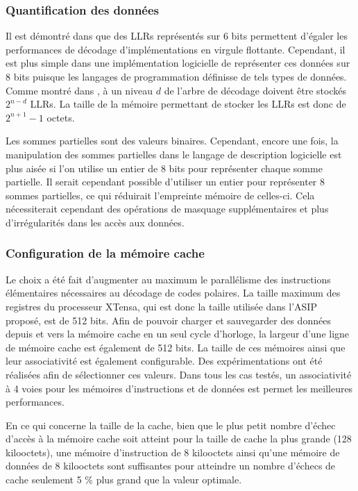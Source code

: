 \subsubsection{Quantification des données}
Il est démontré dans \cite{sarkis_fast_2014} que des LLRs représentés sur 6 bits permettent d'égaler les performances de décodage d'implémentations en virgule flottante. Cependant, il est plus simple dans une implémentation logicielle de représenter ces données sur 8 bits puisque les langages de programmation définisse de tels types de données. Comme montré dans \cite{leroux_hardware_2011}, à un niveau $d$ de l'arbre de décodage doivent être stockés $2^{n-d}$ LLRs. La taille de la mémoire permettant de stocker les LLRs est donc de $2^{n+1}-1$ octets.

Les sommes partielles sont des valeurs binaires. Cependant, encore une fois, la manipulation des sommes partielles dans le langage de description logicielle est plus aisée si l'on utilise un entier de 8 bits pour représenter chaque somme partielle. Il serait cependant possible d'utiliser un entier pour représenter 8 sommes partielles, ce qui réduirait l'empreinte mémoire de celles-ci. Cela nécessiterait cependant des opérations de masquage supplémentaires et plus d'irrégularités dans les accès aux données.

\subsubsection{Configuration de la mémoire cache}
Le choix a été fait d'augmenter au maximum le parallélisme des instructions élémentaires nécessaires au décodage de codes polaires. La taille maximum des registres du processeur XTensa, qui est donc la taille utilisée dans l'ASIP proposé, est de 512 bits. Afin de pouvoir charger et sauvegarder des données depuis et vers la mémoire cache en un seul cycle d'horloge, la largeur d'une ligne de mémoire cache est également de 512 bits. La taille de ces mémoires ainsi que leur associativité est également configurable. Des expérimentations ont été réalisées afin de sélectionner ces valeurs. Dans tous les cas testés, un associativité à 4 voies pour les mémoires d'instructions et de données est permet les meilleures performances.

En ce qui concerne la taille de la cache, bien que le plus petit nombre d'échec d'accès à la mémoire cache soit atteint pour la taille de cache la plus grande (128 kilooctets), une mémoire d'instruction de 8 kilooctets ainsi qu'une mémoire de données de 8 kilooctets sont suffisantes pour atteindre un nombre d'échecs de cache seulement 5 \%
plus grand que la valeur optimale.

